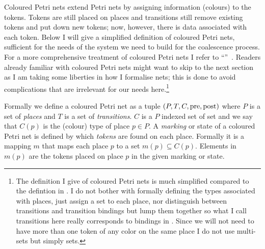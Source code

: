 Coloured Petri nets extend Petri nets by assigning information (colours) to the tokens. Tokens are still placed on places and transitions still remove existing tokens and put down new tokens; now, however, there is data associated with each token. Below I will give a simplified definition of coloured Petri nets, sufficient for the needs of the system we need to build for the coalescence process. For a more comprehensive treatment of coloured Petri nets I refer to \citeauthor{Jensen:2009ti} ``''~\cite{Jensen:2009ti}. Readers already familiar with coloured Petri nets might want to skip to the next section as I am taking some liberties in how I formalise nets; this is done to avoid complications that are irrelevant for our needs here.\footnote{The definition I give of coloured Petri nets is much simplified compared to the defintion in \citet{Jensen:2009ti}. I do not bother with formally defining the types associated with places, just assign a set to each place, nor distinguish between transitions and transition bindings but lump them together so what I call transitions here really corresponds to bindings in \citet{Jensen:2009ti}. Since we will not need to have more than one token of any color on the same place I do not use multi-sets but simply sets.}

Formally we define a coloured Petri net as a tuple $(P,T,C,\operatorname{pre},\operatorname{post})$ where $P$ is a set of \emph{places} and $T$ is a set of \emph{transitions}. $C$ is a $P$ indexed set of set and we say that $C(p)$ is the (colour) type of place $p\in P$. A \emph{marking} or state of a coloured Petri net is defined by which \emph{tokens} are found on each place. Formally it is a mapping $m$ that maps each place $p$ to a set $m(p)\subseteq C(p)$. Elements in $m(p)$ are the tokens placed on place $p$ in the given marking or state.

